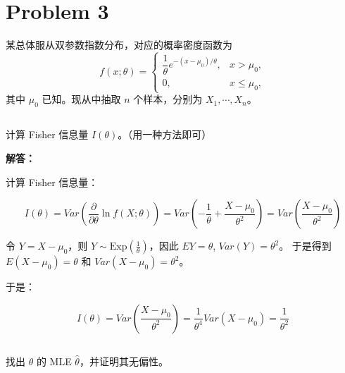 \documentclass[12pt,a4paper]{article}
\begin{document}
\section{Problem 3}

某总体服从双参数指数分布，对应的概率密度函数为
\[
  f(x;\theta)=
  \begin{cases}
    \dfrac{1}{\theta}e^{-(x-\mu_0)/\theta}, & x>\mu_0,\\[0.4em]
    0, & x\le \mu_0,
  \end{cases}
\]
其中 $\mu_0$ 已知。现从中抽取 $n$ 个样本，分别为 $X_1,\cdots,X_n$。

\subsection{}

计算 Fisher 信息量 $I(\theta)$。（用一种方法即可）

\begin{answerbox}
\textbf{解答：}

计算 Fisher 信息量：

$$
I(\theta) = Var\left(\frac{\partial}{\partial \theta} \ln f(X; \theta)\right) = Var\left(-\frac{1}{\theta} + \frac{X-\mu_0}{\theta^2}\right) = Var\left(\frac{X-\mu_0}{\theta^2}\right) 
$$

令 $Y = X-\mu_0$，则 $Y \sim \text{Exp}(\frac{1}{\theta})$，因此 $EY = \theta$, $Var(Y) = \theta^2$。
于是得到 $E(X-\mu_0) = \theta$ 和 $Var(X-\mu_0) = \theta^2$。

于是：

$$
I(\theta) = Var\left(\frac{X-\mu_0}{\theta^2}\right) = \frac{1}{\theta^4} Var(X-\mu_0) = \frac{1}{\theta ^2}
$$

\end{answerbox}

\subsection{}

找出 $\theta$ 的 MLE $\hat{\theta}$，并证明其无偏性。
\end{document}
